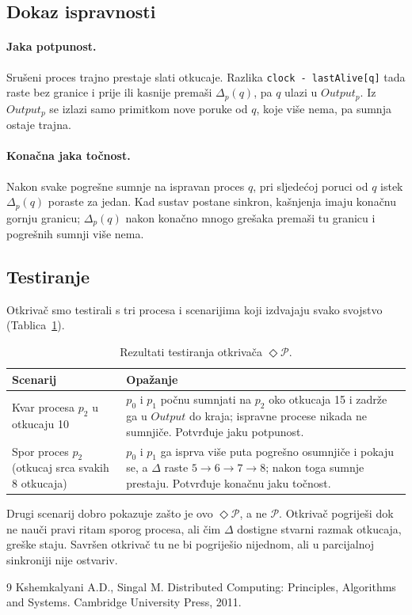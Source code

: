\documentclass[11pt,a4paper]{article}
\newcommand{\Dp}{\ensuremath{\mathcal{P}}}
\newcommand{\eP}{\ensuremath{\Diamond\mathcal{P}}}
\begin{document}
\subsection{Dokaz ispravnosti}

\paragraph{Jaka potpunost.} Srušeni proces trajno prestaje slati otkucaje.
Razlika \texttt{clock - lastAlive[q]} tada raste bez granice i prije ili kasnije
premaši $\Delta_p(q)$, pa $q$ ulazi u $Output_p$. Iz $Output_p$ se izlazi samo
primitkom nove poruke od $q$, koje više nema, pa sumnja ostaje trajna.

\paragraph{Konačna jaka točnost.} Nakon svake pogrešne sumnje na ispravan proces
$q$, pri sljedećoj poruci od $q$ istek $\Delta_p(q)$ poraste za jedan. Kad sustav
postane sinkron, kašnjenja imaju konačnu gornju granicu; $\Delta_p(q)$ nakon
konačno mnogo grešaka premaši tu granicu i pogrešnih sumnji više nema.

\subsection{Testiranje}

Otkrivač smo testirali s tri procesa i scenarijima koji izdvajaju svako svojstvo
(Tablica~\ref{tab:test}).

\begin{table}[h]
\centering
\begin{tabular}{lp{9cm}}
\toprule
Scenarij & Opažanje \\
\midrule
Kvar procesa $p_2$ u otkucaju 10 &
$p_0$ i $p_1$ počnu sumnjati na $p_2$ oko otkucaja 15 i zadrže ga u $Output$ do
kraja; ispravne procese nikada ne sumnjiče. Potvrđuje jaku potpunost. \\
\addlinespace
Spor proces $p_2$ (otkucaj srca svakih 8 otkucaja) &
$p_0$ i $p_1$ ga isprva više puta pogrešno osumnjiče i pokaju se, a $\Delta$ raste
$5 \to 6 \to 7 \to 8$; nakon toga sumnje prestaju. Potvrđuje konačnu jaku
točnost. \\
\bottomrule
\end{tabular}
\caption{Rezultati testiranja otkrivača \eP.}
\label{tab:test}
\end{table}

Drugi scenarij dobro pokazuje zašto je ovo \eP, a ne \Dp. Otkrivač pogriješi dok
ne nauči pravi ritam sporog procesa, ali čim $\Delta$ dostigne stvarni razmak
otkucaja, greške staju. Savršen otkrivač tu ne bi pogriješio nijednom, ali u
parcijalnoj sinkroniji nije ostvariv.

\begin{thebibliography}{9}
Kshemkalyani A.D., Singal M. Distributed Computing: Principles, Algorithms and Systems. Cambridge University Press, 2011.
\end{thebibliography}
\end{document}
